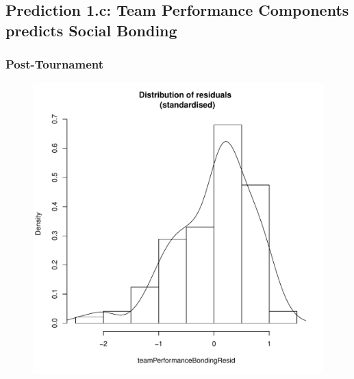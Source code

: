 \begin{CJK}{UTF8}{gbsn}
       \subsection{Prediction 1.c: Team Performance Components predicts Social Bonding\label{app8:prediction1c}}


            \subsubsection{Post-Tournament\label{app8:prediction1cPost}}

                


            \begin{figure}[htbp]
              \includegraphics[scale =.4]{images/MLM3aHist.pdf}

\end{figure}
\end{CJK}
